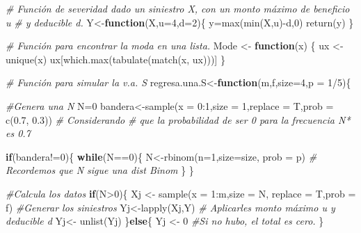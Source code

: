 \documentclass[
]{article}
\newenvironment{Shaded}{\begin{snugshade}}{\end{snugshade}}
\newcommand{\AttributeTok}[1]{\textcolor[rgb]{0.77,0.63,0.00}{#1}}
\newcommand{\CommentTok}[1]{\textcolor[rgb]{0.56,0.35,0.01}{\textit{#1}}}
\newcommand{\ControlFlowTok}[1]{\textcolor[rgb]{0.13,0.29,0.53}{\textbf{#1}}}
\newcommand{\DecValTok}[1]{\textcolor[rgb]{0.00,0.00,0.81}{#1}}
\newcommand{\FloatTok}[1]{\textcolor[rgb]{0.00,0.00,0.81}{#1}}
\newcommand{\FunctionTok}[1]{\textcolor[rgb]{0.00,0.00,0.00}{#1}}
\newcommand{\NormalTok}[1]{#1}
\newcommand{\OtherTok}[1]{\textcolor[rgb]{0.56,0.35,0.01}{#1}}
\newcommand{\SpecialCharTok}[1]{\textcolor[rgb]{0.00,0.00,0.00}{#1}}
\begin{document}
\begin{Shaded}
\begin{Highlighting}[]
\CommentTok{\# Función de severidad dado un siniestro X, con un monto máximo de beneficio u }
\CommentTok{\# y deducible d.}
\NormalTok{Y}\OtherTok{\textless{}{-}}\ControlFlowTok{function}\NormalTok{(X,}\AttributeTok{u=}\DecValTok{4}\NormalTok{,}\AttributeTok{d=}\DecValTok{2}\NormalTok{)\{}
\NormalTok{  y}\OtherTok{=}\FunctionTok{max}\NormalTok{(}\FunctionTok{min}\NormalTok{(X,u)}\SpecialCharTok{{-}}\NormalTok{d,}\DecValTok{0}\NormalTok{)}
  \FunctionTok{return}\NormalTok{(y)}
\NormalTok{\}}

\CommentTok{\# Función para encontrar la moda en una lista.}
\NormalTok{Mode }\OtherTok{\textless{}{-}} \ControlFlowTok{function}\NormalTok{(x) \{}
\NormalTok{  ux }\OtherTok{\textless{}{-}} \FunctionTok{unique}\NormalTok{(x)}
\NormalTok{  ux[}\FunctionTok{which.max}\NormalTok{(}\FunctionTok{tabulate}\NormalTok{(}\FunctionTok{match}\NormalTok{(x, ux)))]}
\NormalTok{\}}

\CommentTok{\# Función para simular la v.a. S}
\NormalTok{regresa.una.S}\OtherTok{\textless{}{-}}\ControlFlowTok{function}\NormalTok{(m,f,}\AttributeTok{size=}\DecValTok{4}\NormalTok{,}\AttributeTok{p =} \DecValTok{1}\SpecialCharTok{/}\DecValTok{5}\NormalTok{)\{}
  
  \CommentTok{\#Genera una N}
\NormalTok{  N}\OtherTok{=}\DecValTok{0}
\NormalTok{  bandera}\OtherTok{\textless{}{-}}\FunctionTok{sample}\NormalTok{(}\AttributeTok{x =} \DecValTok{0}\SpecialCharTok{:}\DecValTok{1}\NormalTok{,}\AttributeTok{size =} \DecValTok{1}\NormalTok{,}\AttributeTok{replace =}\NormalTok{ T,}\AttributeTok{prob =} \FunctionTok{c}\NormalTok{(}\FloatTok{0.7}\NormalTok{, }\FloatTok{0.3}\NormalTok{)) }\CommentTok{\# Considerando}
  \CommentTok{\# que la probabilidad de ser 0 para la frecuencia N* es 0.7}
  
  \ControlFlowTok{if}\NormalTok{(bandera}\SpecialCharTok{!=}\DecValTok{0}\NormalTok{)\{}
    \ControlFlowTok{while}\NormalTok{(N}\SpecialCharTok{==}\DecValTok{0}\NormalTok{)\{}
\NormalTok{      N}\OtherTok{\textless{}{-}}\FunctionTok{rbinom}\NormalTok{(}\AttributeTok{n=}\DecValTok{1}\NormalTok{,}\AttributeTok{size=}\NormalTok{size, }\AttributeTok{prob =}\NormalTok{ p) }\CommentTok{\# Recordemos que N sigue una dist Binom}
\NormalTok{    \}}
\NormalTok{  \}}
  
  \CommentTok{\#Calcula los datos}
  \ControlFlowTok{if}\NormalTok{(N}\SpecialCharTok{\textgreater{}}\DecValTok{0}\NormalTok{)\{}
\NormalTok{    Xj }\OtherTok{\textless{}{-}} \FunctionTok{sample}\NormalTok{(}\AttributeTok{x =} \DecValTok{1}\SpecialCharTok{:}\NormalTok{m,}\AttributeTok{size =}\NormalTok{ N,}
                 \AttributeTok{replace =}\NormalTok{ T,}\AttributeTok{prob =}\NormalTok{ f) }\CommentTok{\#Generar los siniestros}
\NormalTok{    Yj}\OtherTok{\textless{}{-}}\FunctionTok{lapply}\NormalTok{(Xj,Y) }\CommentTok{\# Aplicarles monto máximo u y deducible d}
\NormalTok{    Yj}\OtherTok{\textless{}{-}} \FunctionTok{unlist}\NormalTok{(Yj)}
\NormalTok{  \}}\ControlFlowTok{else}\NormalTok{\{}
\NormalTok{    Yj }\OtherTok{\textless{}{-}} \DecValTok{0} \CommentTok{\#Si no hubo, el total es cero.}
\NormalTok{  \}}
  

\end{Highlighting}
\end{Shaded}
\end{document}
